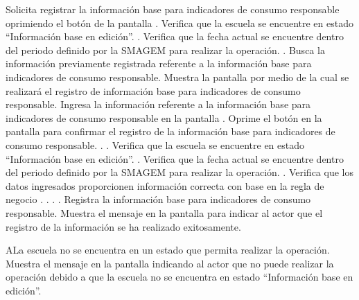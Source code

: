 \begin{UCtrayectoria}
    \UCpaso[\UCactor] Solicita registrar la información base para indicadores de consumo responsable oprimiendo el botón \botEdit de la pantalla .
    \UCpaso[\UCsist] Verifica que la escuela se encuentre en estado ``Información base en edición''. .
    \UCpaso[\UCsist] Verifica que la fecha actual se encuentre dentro del periodo definido por la SMAGEM para realizar la operación. .
    \UCpaso[\UCsist] Busca la información previamente registrada referente a la información base para indicadores de consumo responsable.
    \UCpaso[\UCsist] Muestra la pantalla  por medio de la cual se realizará el registro de información base para indicadores de consumo responsable.
    \UCpaso[\UCactor] Ingresa la información referente a la información base para indicadores de consumo responsable en la pantalla . \label{cuibcr2:IngresarDatos}
    \UCpaso[\UCactor] Oprime el botón  en la pantalla  para confirmar el registro de la información base para indicadores de consumo responsable. . .
    \UCpaso[\UCsist] Verifica que la escuela se encuentre en estado ``Información base en edición''. . \label{cuibcr2:VerificarRegistro} 
    \UCpaso[\UCsist] Verifica que la fecha actual se encuentre dentro del periodo definido por la SMAGEM para realizar la operación. .
    \UCpaso[\UCsist] Verifica que los datos ingresados proporcionen información correcta con base en la regla de negocio . . . .    
    \UCpaso[\UCsist] Registra la información base para indicadores de consumo responsable.
    \UCpaso[\UCsist] Muestra el mensaje  en la pantalla  para indicar al actor que el registro de la información se ha realizado exitosamente.    
 \end{UCtrayectoria}
 
    \begin{UCtrayectoriaA}{A}{La escuela no se encuentra en un estado que permita realizar la operación.}
    \UCpaso[\UCsist] Muestra el mensaje  en la pantalla  indicando al actor que no puede realizar la operación debido a que la escuela no se encuentra en estado ``Información base en edición''. 
 \end{UCtrayectoriaA}

